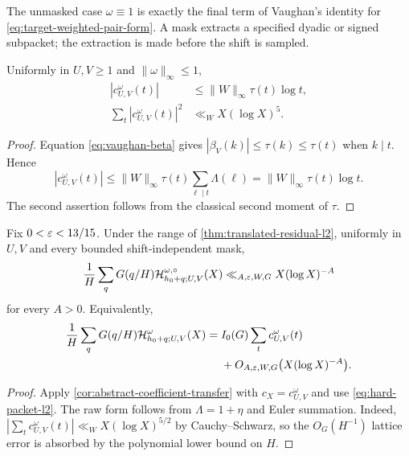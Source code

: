 The unmasked case $\omega\equiv1$ is exactly the final term of Vaughan's
identity for \eqref{eq:target-weighted-pair-form}.  A mask extracts a
specified dyadic or signed subpacket; the extraction is made before the
shift is sampled.

\begin{lemma}
\label{lem:hard-packet-ledger}
Uniformly in $U,V\geq1$ and $\|\omega\|_\infty\leq1$,
\begin{align}
 |c_{U,V}^{\omega}(t)|
 &\leq\|W\|_\infty\tau(t)\log t,
 \label{eq:hard-packet-pointwise}\\
 \sum_t|c_{U,V}^{\omega}(t)|^2
 &\ll_WX(\log X)^5.
 \label{eq:hard-packet-l2}
\end{align}
\end{lemma}

\begin{proof}
Equation \eqref{eq:vaughan-beta} gives
$|\beta_V(k)|\leq\tau(k)\leq\tau(t)$ when $k\mid t$.  Hence
\[
 |c_{U,V}^{\omega}(t)|
 \leq\|W\|_\infty\tau(t)
 \sum_{\ell\mid t}\Lambda(\ell)
 =\|W\|_\infty\tau(t)\log t.
\]
The second assertion follows from the classical second moment of $\tau$.
\end{proof}

\begin{theorem}
\label{thm:masked-hard-packet-transfer}
Fix $0<\varepsilon<13/15$.  Under the range of
\cref{thm:translated-residual-l2}, uniformly in $U,V$ and every bounded
shift-independent mask,
\begin{equation}
 \frac1H\sum_qG(q/H)
 \mathcal H_{h_0+q;U,V}^{\omega,\circ}(X)
 \ll_{A,\varepsilon,W,G}X(\log X)^{-A}
 \label{eq:centered-hard-packet-transfer}
\end{equation}
for every $A>0$.  Equivalently,
\begin{align}
 \frac1H\sum_qG(q/H)
 \mathcal H_{h_0+q;U,V}^{\omega}(X)
 ={}&I_0(G)\sum_tc_{U,V}^{\omega}(t)
 \notag\\
 &+O_{A,\varepsilon,W,G}\bigl(X(\log X)^{-A}\bigr).
 \label{eq:raw-hard-packet-transfer}
\end{align}
\end{theorem}

\begin{proof}
Apply \cref{cor:abstract-coefficient-transfer} with
$c_X=c_{U,V}^{\omega}$ and use
\eqref{eq:hard-packet-l2}.  The raw form follows from
$\Lambda=1+\eta$ and Euler summation.  Indeed,
$|\sum_t c_{U,V}^{\omega}(t)|\ll_WX(\log X)^{5/2}$ by Cauchy--Schwarz,
so the $O_G(H^{-1})$ lattice error is absorbed by the polynomial lower
bound on $H$.
\end{proof}

